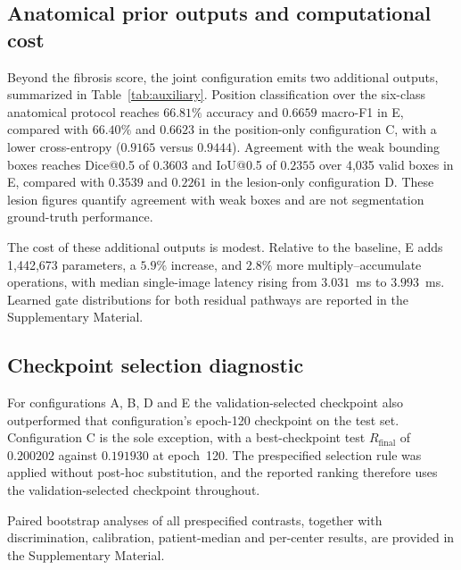 \subsection{Anatomical prior outputs and computational cost}

Beyond the fibrosis score, the joint configuration emits two additional
outputs, summarized in Table~\ref{tab:auxiliary}. Position classification over
the six-class anatomical protocol reaches $66.81\%$ accuracy and $0.6659$
macro-F1 in E, compared with $66.40\%$ and $0.6623$ in the position-only
configuration C, with a lower cross-entropy ($0.9165$ versus $0.9444$).
Agreement with the weak bounding boxes reaches Dice@0.5 of $0.3603$ and
IoU@0.5 of $0.2355$ over 4,035 valid boxes in E, compared with $0.3539$ and
$0.2261$ in the lesion-only configuration D. These lesion figures quantify
agreement with weak boxes and are not segmentation ground-truth performance.

The cost of these additional outputs is modest. Relative to the baseline,
E adds 1,442,673 parameters, a $5.9\%$ increase, and $2.8\%$ more
multiply--accumulate operations, with median single-image latency rising from
$3.031$~ms to $3.993$~ms. Learned gate distributions for both residual pathways
are reported in the Supplementary Material.

\subsection{Checkpoint selection diagnostic}

For configurations A, B, D and E the validation-selected checkpoint also
outperformed that configuration's epoch-120 checkpoint on the test set.
Configuration C is the sole exception, with a best-checkpoint test
$R_{\mathrm{final}}$ of $0.200202$ against $0.191930$ at epoch~120. The
prespecified selection rule was applied without post-hoc substitution, and the
reported ranking therefore uses the validation-selected checkpoint throughout.

Paired bootstrap analyses of all prespecified contrasts, together with
discrimination, calibration, patient-median and per-center results, are
provided in the Supplementary Material.
